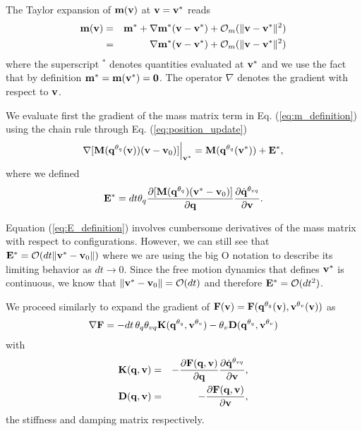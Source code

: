 \begin{IEEEproof}
The Taylor expansion of ${\mathbf{m}}({\mathbf{v}})$ at ${\mathbf{v}}={\mathbf{v}}^*$ reads
\begin{eqnarray}
	\mf{m}(\mf{v}) &=& \mf{m}^* +
	\nabla\mf{m}^*(\mf{v}-\mf{v}^*) + \mathcal{O}_m(\Vert\mf{v}-\mf{v}^*\Vert^2)\nonumber\\
	&=&\nabla\mf{m}^*(\mf{v}-\mf{v}^*) + \mathcal{O}_m(\Vert\mf{v}-\mf{v}^*\Vert^2)
	\label{eq:m_taylor_expansion}
\end{eqnarray}
where the superscript $^*$ denotes quantities evaluated at ${\mathbf{v}}^*$ and we use
the fact that by definition ${\mathbf{m}}^*={\mathbf{m}}({\mathbf{v}}^*)={\mathbf{0}}$. The operator
$\nabla$ denotes the gradient with respect to ${\mathbf{v}}$.

We evaluate first the gradient of the mass matrix term in Eq.
(\ref{eq:m_definition}) using the chain rule through Eq.
(\ref{eq:position_update})
\begin{eqnarray}
	\nabla[{\mathbf{M}}({\mathbf{q}}^{\theta_{q}}({\mathbf{v}}))({\mathbf{v}}-{\mathbf{v}}_0)]\Bigr|_{{\mathbf{v}}^*}
	= {\mathbf{M}}({\mathbf{q}}^{\theta_{q}}({\mathbf{v}}^*)) + {\mathbf{E}}^*,
\end{eqnarray}
where we defined
\begin{eqnarray}
	\mf{E}^* =
	dt\theta_q\frac{\partial[\mf{M}(\mf{q}^{\theta_{q}})(\mf{v}^*-\mf{v}_0)]}{\partial\mf{q}}\frac{\partial\dot{\mf{q}}^{\theta_{vq}}}{\partial\mf{v}}.
	\label{eq:E_definition}
\end{eqnarray}

Equation (\ref{eq:E_definition}) involves cumbersome derivatives of the mass matrix with respect to configurations. However, we can still see that ${\mathbf{E}}^*=\mathcal{O}(dt\Vert{\mathbf{v}}^*-{\mathbf{v}}_0\Vert)$ where we are using the big O notation to describe its limiting behavior as $dt\rightarrow 0$. Since the free motion dynamics that defines ${\mathbf{v}}^*$ is continuous, we know that $\Vert{\mathbf{v}}^*-{\mathbf{v}}_0\Vert = \mathcal{O}(dt)$ and therefore ${\mathbf{E}}^* = \mathcal{O}(dt^2)$.

We proceed similarly to expand the gradient of ${\mathbf{F}}({\mathbf{v}})={\mathbf{F}}({\mathbf{q}}^{\theta_{q}}({\mathbf{v}}), {\mathbf{v}}^{\theta_v}({\mathbf{v}}))$ as
\begin{eqnarray}
	\nabla{\mathbf{F}} =
	-dt\,\theta_q\theta_{vq}{\mathbf{K}}({\mathbf{q}}^{\theta_q}, {\mathbf{v}}^{\theta_v})-\theta_v{\mathbf{D}}({\mathbf{q}}^{\theta_q}, {\mathbf{v}}^{\theta_v})
\end{eqnarray}
with 
\begin{eqnarray}
	\mf{K}(\mf{q}, \mf{v})&=&-\frac{\partial \mf{F}(\mf{q}, \mf{v})}{\partial \mf{q}}\frac{\partial\dot{\mf{q}}^{\theta_{vq}}}{\partial\mf{v}},\\
	\mf{D}(\mf{q}, \mf{v})&=&-\frac{\partial \mf{F}(\mf{q}, \mf{v})}{\partial \mf{v}},
	\label{eq:dissipation_matrix}
\end{eqnarray}
the stiffness and damping matrix respectively.


\end{IEEEproof}
